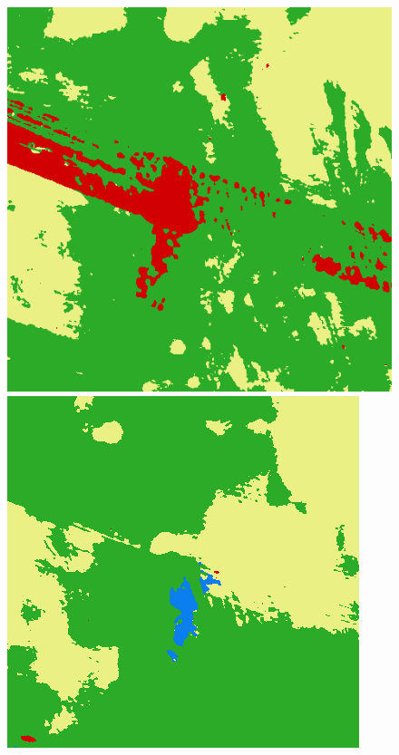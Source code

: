 \begin{figure}
    \includegraphics[width=\UnetPredictionsImageWidth]{images/unet/unet-18D/114975-prediction} \hfill
    \includegraphics[width=\UnetPredictionsImageWidth]{images/unet/unet-23/114975-prediction} \hfill

\end{figure}
